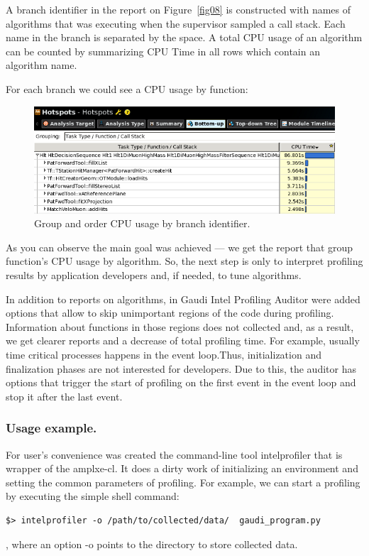\documentclass[a4paper]{jpconf}
\begin{document}
A branch identifier in the report on Figure~\ref{fig08} is constructed with names of algorithms that was executing 
when the \amp supervisor sampled a call stack. Each name in the branch is separated by the space. A total CPU usage 
of an algorithm can be counted by summarizing CPU Time in all rows which contain an algorithm name.

For each branch we could see a CPU usage by function:

\begin{figure}[H]
\begin{minipage}{\textwidth}
\includegraphics[width=\textwidth]{figs/fig09.png}
\caption{\label{fig09}Group and order CPU usage by branch identifier.}
\end{minipage}
\end{figure}

As you can observe the main goal was achieved --- we get the report that group function’s CPU usage by algorithm. 
So, the next step is only to interpret profiling results by application developers and, if needed, to tune algorithms.

In addition to reports on algorithms, in Gaudi Intel Profiling Auditor were added options that allow to skip 
unimportant regions of the code during profiling. Information about functions in those regions does not collected and, 
as a result, we get clearer reports and a decrease of total profiling time. For example, usually time critical 
processes happens in the event loop.Thus, initialization and finalization phases are not interested for developers. 
Due to this, the auditor has options that trigger the start of  profiling on the first event in the event loop 
and stop it after the last event. 

\subsubsection{Usage example.}

For user’s convenience was created the command-line tool intelprofiler that is wrapper of the amplxe-cl. 
It does a dirty work of initializing an environment and setting the common parameters of profiling. 
For example, we can start a profiling by executing the simple shell command:
\begin{verbatim}
$> intelprofiler -o /path/to/collected/data/  gaudi_program.py
\end{verbatim}
, where an option -o points to the directory to store collected data. 
\end{document}
